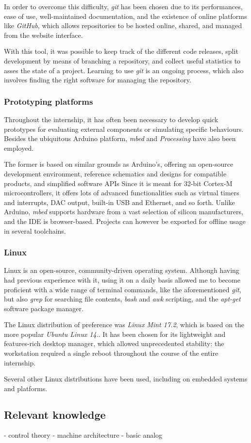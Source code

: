 In order to overcome this difficulty, \emph{git} has been chosen due to its performances, ease of use, well-maintained documentation, and the existence of online platforms like \emph{GitHub}, which allows repositories to be hosted online, shared, and managed from the website interface.

With this tool, it was possible to keep track of the different code releases, split development by means of branching a repository, and collect useful statistics to asses the state of a project.
Learning to use \emph{git} is an ongoing process, which also involves finding the right software for managing the repository.



\subsubsection{Prototyping platforms}
Throughout the internship, it has often been necessary to develop quick prototypes for evaluating external components or simulating specific behaviours.
Besides the ubiquitous Arduino platform, \emph{mbed} and \emph{Processing} have also been employed.

The former is based on similar grounds as Arduino's, offering an open-source development environment, reference schematics and designs for compatible products, and simplified software APIs
Since it is meant for 32-bit Cortex-M microcontrollers, it offers lots of advanced functionalities such as virtual timers and interrupts, DAC output, built-in USB and Ethernet, and so forth.
Unlike Arduino, \emph{mbed} supports hardware from a vast selection of silicon manufacturers, and the IDE is browser-based. 
Projects can however be exported for offline usage in several toolchains.



\subsubsection{Linux}
Linux is an open-source, community-driven operating system.
Although having had previous experience with it, using it on a daily basis allowed me to become proficient with a wide range of terminal commands, like the aforementioned \emph{git}, but also \emph{grep} for searching file contents, \emph{bash} and \emph{awk} scripting, and the \emph{apt-get} software package manager.

The Linux distribution of preference was \emph{Linux Mint 17.2}, which is based on the more popular \emph{Ubuntu Linux 14.}.
It has been chosen for its lightweight and features-rich desktop manager, which allowed unprecedented stability: the workstation required a single reboot throughout the course of the entire internship.

Several other Linux distributions have been used, including on embedded systems and platforms.


\subsection{Relevant knowledge}

- control theory
- machine architecture
- basic analog